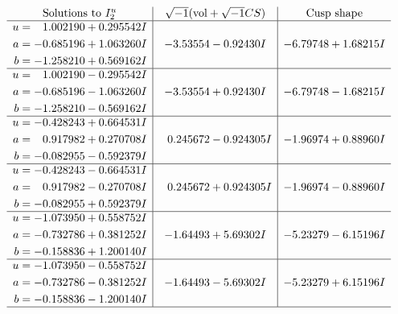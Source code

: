 \documentclass[1p]{elsarticle_modified}
\theoremstyle{definition}
\newcommand{\I}{\sqrt{-1}}
\begin{document}
$$\begin{array}{c|c|c}  
\text{Solutions to }I^u_{2}& \I (\text{vol} + \sqrt{-1}CS) & \text{Cusp shape}\\
 \hline 
\begin{aligned}
u &= \phantom{-}1.002190 + 0.295542 I \\
a &= -0.685196 + 1.063260 I \\
b &= -1.258210 + 0.569162 I\end{aligned}
 & -3.53554 - 0.92430 I & -6.79748 + 1.68215 I \\ \hline\begin{aligned}
u &= \phantom{-}1.002190 - 0.295542 I \\
a &= -0.685196 - 1.063260 I \\
b &= -1.258210 - 0.569162 I\end{aligned}
 & -3.53554 + 0.92430 I & -6.79748 - 1.68215 I \\ \hline\begin{aligned}
u &= -0.428243 + 0.664531 I \\
a &= \phantom{-}0.917982 + 0.270708 I \\
b &= -0.082955 - 0.592379 I\end{aligned}
 & \phantom{-}0.245672 - 0.924305 I & -1.96974 + 0.88960 I \\ \hline\begin{aligned}
u &= -0.428243 - 0.664531 I \\
a &= \phantom{-}0.917982 - 0.270708 I \\
b &= -0.082955 + 0.592379 I\end{aligned}
 & \phantom{-}0.245672 + 0.924305 I & -1.96974 - 0.88960 I \\ \hline\begin{aligned}
u &= -1.073950 + 0.558752 I \\
a &= -0.732786 + 0.381252 I \\
b &= -0.158836 + 1.200140 I\end{aligned}
 & -1.64493 + 5.69302 I & -5.23279 - 6.15196 I \\ \hline\begin{aligned}
u &= -1.073950 - 0.558752 I \\
a &= -0.732786 - 0.381252 I \\
b &= -0.158836 - 1.200140 I\end{aligned}
 & -1.64493 - 5.69302 I & -5.23279 + 6.15196 I\\
 \hline 
 \end{array}$$\newpage
\newpage\renewcommand{\arraystretch}{1}
\end{document}
